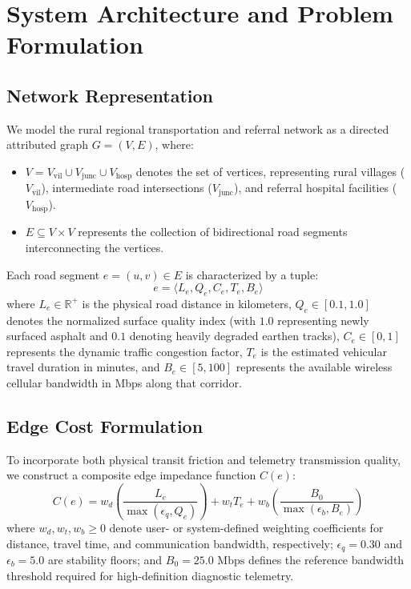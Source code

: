 \documentclass[conference]{IEEEtran}
\begin{document}
\section{System Architecture and Problem Formulation}

\subsection{Network Representation}
We model the rural regional transportation and referral network as a directed attributed graph $G = (V, E)$, where:
\begin{itemize}
    \item $V = V_{\text{vil}} \cup V_{\text{junc}} \cup V_{\text{hosp}}$ denotes the set of vertices, representing rural villages ($V_{\text{vil}}$), intermediate road intersections ($V_{\text{junc}}$), and referral hospital facilities ($V_{\text{hosp}}$).
    \item $E \subseteq V \times V$ represents the collection of bidirectional road segments interconnecting the vertices.
\end{itemize}

Each road segment $e = (u, v) \in E$ is characterized by a tuple:
\begin{equation}
e = \langle L_e, Q_e, C_e, T_e, B_e \rangle
\end{equation}
where $L_e \in \mathbb{R}^+$ is the physical road distance in kilometers, $Q_e \in [0.1, 1.0]$ denotes the normalized surface quality index (with $1.0$ representing newly surfaced asphalt and $0.1$ denoting heavily degraded earthen tracks), $C_e \in [0, 1]$ represents the dynamic traffic congestion factor, $T_e$ is the estimated vehicular travel duration in minutes, and $B_e \in [5, 100]$ represents the available wireless cellular bandwidth in Mbps along that corridor.

\subsection{Edge Cost Formulation}
To incorporate both physical transit friction and telemetry transmission quality, we construct a composite edge impedance function $C(e)$:
\begin{equation}
C(e) = w_d \left( \frac{L_e}{\max(\epsilon_q, Q_e)} \right) + w_t T_e + w_b \left( \frac{B_0}{\max(\epsilon_b, B_e)} \right)
\label{eq:edge_cost}
\end{equation}
where $w_d, w_t, w_b \ge 0$ denote user- or system-defined weighting coefficients for distance, travel time, and communication bandwidth, respectively; $\epsilon_q = 0.30$ and $\epsilon_b = 5.0$ are stability floors; and $B_0 = 25.0 \text{ Mbps}$ defines the reference bandwidth threshold required for high-definition diagnostic telemetry.
\end{document}
